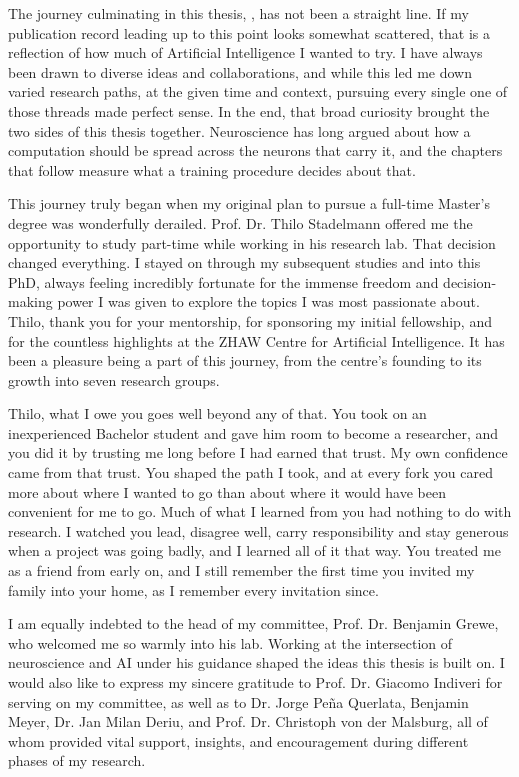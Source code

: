 The journey culminating in this thesis, \emph{\thesistitle}, has not been a straight line. If my publication record leading up to this point looks somewhat scattered, that is a reflection of how much of Artificial Intelligence I wanted to try. I have always been drawn to diverse ideas and collaborations, and while this led me down varied research paths, at the given time and context, pursuing every single one of those threads made perfect sense. In the end, that broad curiosity brought the two sides of this thesis together. Neuroscience has long argued about how a computation should be spread across the neurons that carry it, and the chapters that follow measure what a training procedure decides about that.

This journey truly began when my original plan to pursue a full-time Master's degree was wonderfully derailed. Prof. Dr. Thilo Stadelmann offered me the opportunity to study part-time while working in his research lab. That decision changed everything. I stayed on through my subsequent studies and into this PhD, always feeling incredibly fortunate for the immense freedom and decision-making power I was given to explore the topics I was most passionate about. Thilo, thank you for your mentorship, for sponsoring my initial fellowship, and for the countless highlights at the ZHAW Centre for Artificial Intelligence. It has been a pleasure being a part of this journey, from the centre's founding to its growth into seven research groups.

Thilo, what I owe you goes well beyond any of that. You took on an inexperienced Bachelor student and gave him room to become a researcher, and you did it by trusting me long before I had earned that trust. My own confidence came from that trust. You shaped the path I took, and at every fork you cared more about where I wanted to go than about where it would have been convenient for me to go. Much of what I learned from you had nothing to do with research. I watched you lead, disagree well, carry responsibility and stay generous when a project was going badly, and I learned all of it that way. You treated me as a friend from early on, and I still remember the first time you invited my family into your home, as I remember every invitation since.

I am equally indebted to the head of my committee, Prof. Dr. Benjamin Grewe, who welcomed me so warmly into his lab. Working at the intersection of neuroscience and AI under his guidance shaped the ideas this thesis is built on. I would also like to express my sincere gratitude to Prof. Dr. Giacomo Indiveri for serving on my committee, as well as to Dr. Jorge Peña Querlata, Benjamin Meyer, Dr. Jan Milan Deriu, and Prof. Dr. Christoph von der Malsburg, all of whom provided vital support, insights, and encouragement during different phases of my research.

